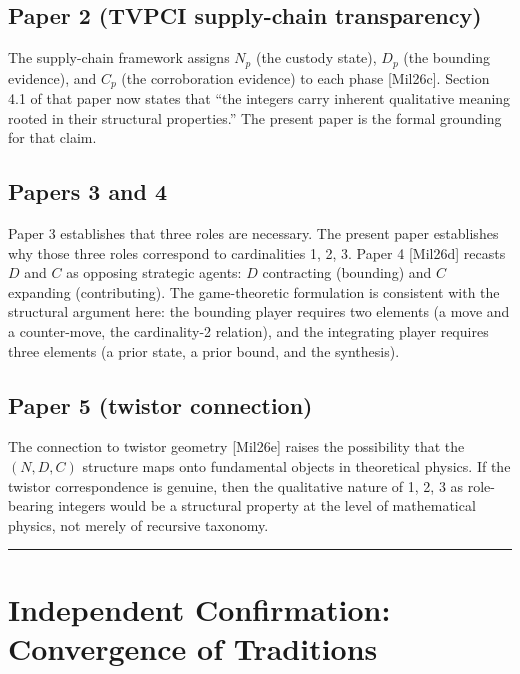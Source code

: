 \documentclass[12pt]{article}
\begin{document}
\subsection{Paper 2 (TVPCI supply-chain transparency)}\label{paper-2-tvpci-supply-chain-transparency}

The supply-chain framework assigns \(N_p\) (the custody state), \(D_p\)
(the bounding evidence), and \(C_p\) (the corroboration evidence) to
each phase {[}Mil26c{]}. Section 4.1 of that paper now states that ``the
integers carry inherent qualitative meaning rooted in their structural
properties.'' The present paper is the formal grounding for that claim.

\subsection{Papers 3 and 4}\label{papers-3-and-4}

Paper 3 establishes that three roles are necessary. The present paper
establishes why those three roles correspond to cardinalities 1, 2, 3.
Paper 4 {[}Mil26d{]} recasts \(D\) and \(C\) as opposing strategic
agents: \(D\) contracting (bounding) and \(C\) expanding (contributing).
The game-theoretic formulation is consistent with the structural
argument here: the bounding player requires two elements (a move and a
counter-move, the cardinality-2 relation), and the integrating player
requires three elements (a prior state, a prior bound, and the
synthesis).

\subsection{Paper 5 (twistor connection)}\label{paper-5-twistor-connection}

The connection to twistor geometry {[}Mil26e{]} raises the possibility
that the \((N, D, C)\) structure maps onto fundamental objects in
theoretical physics. If the twistor correspondence is genuine, then the
qualitative nature of 1, 2, 3 as role-bearing integers would be a
structural property at the level of mathematical physics, not merely of
recursive taxonomy.

\begin{center}\rule{0.5\linewidth}{0.5pt}\end{center}

\section{Independent Confirmation: Convergence of Traditions}\label{independent-confirmation-convergence-of-traditions}
\end{document}
